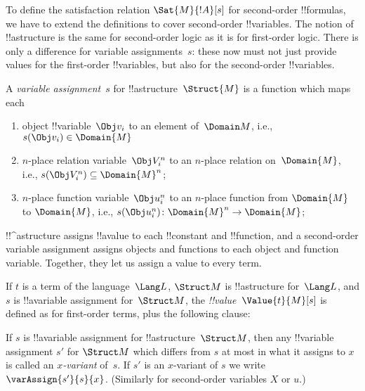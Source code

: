 \documentclass[../../../include/open-logic-section]{subfiles}
\begin{document}

\begin{explain}
To define the satisfaction relation $\Sat{M}{!A}[s]$ for second-order
!!{formula}s, we have to extend the definitions to cover second-order
!!{variable}s.  The notion of !!a{structure} is the same for second-order
logic as it is for first-order logic. There is only a difference for
variable assignments~$s$: these now must not just provide values for
the first-order !!{variable}s, but also for the second-order !!{variable}s.
\end{explain}

\begin{defn}
A \emph{variable assignment}~$s$ for !!a{structure}~$\Struct{M}$ is a
function which maps each
\begin{enumerate}
\item object !!{variable}~$\Obj v_i$ to an element of~$\Domain M$,
  i.e., $s(\Obj v_i) \in \Domain{M}$
\item $n$-place relation variable~$\Obj V_i^n$ to an $n$-place
  relation on~$\Domain{M}$, i.e., $s(\Obj V_i^n) \subseteq \Domain{M}^n$;
\item $n$-place function variable~$\Obj u_i^n$ to an $n$-place
  function from $\Domain{M}$ to $\Domain{M}$, i.e.,
  $s(\Obj u_i^n)\colon \Domain{M}^n \to \Domain{M}$;
\end{enumerate}
\end{defn}

\begin{explain}
!!^a{structure} assigns !!a{value} to each !!{constant} and
!!{function}, and a second-order variable assignment assigns objects and
functions to each object and function variable. Together, they let us
assign a value to every term.
\end{explain}

\begin{defn}
If $t$ is a term of the language~$\Lang L$, $\Struct M$ is
!!a{structure} for~$\Lang L$, and $s$ is !!a{variable} assignment
for~$\Struct M$, the \emph{!!{value}}~$\Value{t}{M}[s]$ is defined as
for first-order terms, plus the following clause:
\begin{quote}
\end{quote}
\end{defn}

\begin{defn}[$x$-Variant]
If $s$ is !!a{variable} assignment for !!a{structure}~$\Struct M$,
then any !!{variable} assignment $s'$ for $\Struct M$ which differs
from $s$ at most in what it assigns to $x$ is called an
\emph{$x$-variant} of~$s$.  If $s'$ is an $x$-variant of $s$ we write
$\varAssign{s'}{s}{x}$. (Similarly for second-order variables $X$ or $u$.)
\end{defn}
\end{document}
